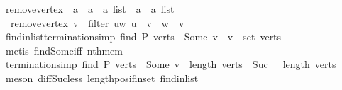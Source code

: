 \begin{isabellebody}
\ remove{\isacharunderscore}{\kern0pt}vertex\ {\isacharcolon}{\kern0pt}{\isacharcolon}{\kern0pt}\ {\isachardoublequoteopen}{\isacharprime}{\kern0pt}a\ {\isasymRightarrow}\ {\isacharparenleft}{\kern0pt}{\isacharprime}{\kern0pt}a\ {\isasymtimes}\ {\isacharprime}{\kern0pt}a{\isacharparenright}{\kern0pt}\ list\ {\isasymRightarrow}\ {\isacharparenleft}{\kern0pt}{\isacharprime}{\kern0pt}a\ {\isasymtimes}\ {\isacharprime}{\kern0pt}a{\isacharparenright}{\kern0pt}\ list{\isachardoublequoteclose}\ \isanewline
\ \ {\isachardoublequoteopen}remove{\isacharunderscore}{\kern0pt}vertex\ v\ {\isacharequal}{\kern0pt}\ filter\ {\isacharparenleft}{\kern0pt}{\isasymlambda}{\isacharparenleft}{\kern0pt}u{\isacharcomma}{\kern0pt}w{\isacharparenright}{\kern0pt}{\isachardot}{\kern0pt}\ u\ {\isasymnoteq}\ v\ {\isasymand}\ w\ {\isasymnoteq}\ v{\isacharparenright}{\kern0pt}{\isachardoublequoteclose}\isanewline
\isanewline
{}\isamarkupfalse%
\ find{\isacharunderscore}{\kern0pt}in{\isacharunderscore}{\kern0pt}list{\isacharbrackleft}{\kern0pt}termination{\isacharunderscore}{\kern0pt}simp{\isacharbrackright}{\kern0pt}{\isacharcolon}{\kern0pt}\ {\isachardoublequoteopen}find\ P\ verts\ {\isacharequal}{\kern0pt}\ Some\ v\ {\isasymLongrightarrow}\ v\ {\isasymin}\ set\ verts{\isachardoublequoteclose}\isanewline
%
\isadelimproof
\ \ %
\endisadelimproof
%
\isatagproof
{}\isamarkupfalse%
\ {\isacharparenleft}{\kern0pt}metis\ find{\isacharunderscore}{\kern0pt}Some{\isacharunderscore}{\kern0pt}iff\ nth{\isacharunderscore}{\kern0pt}mem{\isacharparenright}{\kern0pt}%
\endisatagproof
{\isafoldproof}%
%
\isadelimproof
\isanewline
%
\endisadelimproof
\isanewline
{}\isamarkupfalse%
\ {\isacharbrackleft}{\kern0pt}termination{\isacharunderscore}{\kern0pt}simp{\isacharbrackright}{\kern0pt}{\isacharcolon}{\kern0pt}\ {\isachardoublequoteopen}find\ P\ verts\ {\isacharequal}{\kern0pt}\ Some\ v\ {\isasymLongrightarrow}\ length\ verts\ {\isacharminus}{\kern0pt}\ Suc\ {}\ {\isacharless}{\kern0pt}\ length\ verts{\isachardoublequoteclose}\isanewline
%
\isadelimproof
\ \ %
\endisadelimproof
%
\isatagproof
{}\isamarkupfalse%
\ {\isacharparenleft}{\kern0pt}meson\ diff{\isacharunderscore}{\kern0pt}Suc{\isacharunderscore}{\kern0pt}less\ length{\isacharunderscore}{\kern0pt}pos{\isacharunderscore}{\kern0pt}if{\isacharunderscore}{\kern0pt}in{\isacharunderscore}{\kern0pt}set\ find{\isacharunderscore}{\kern0pt}in{\isacharunderscore}{\kern0pt}list{\isacharparenright}{\kern0pt}%
\endisatagproof
{\isafoldproof}%
%
\isadelimproof
\isanewline

\end{isabellebody}
